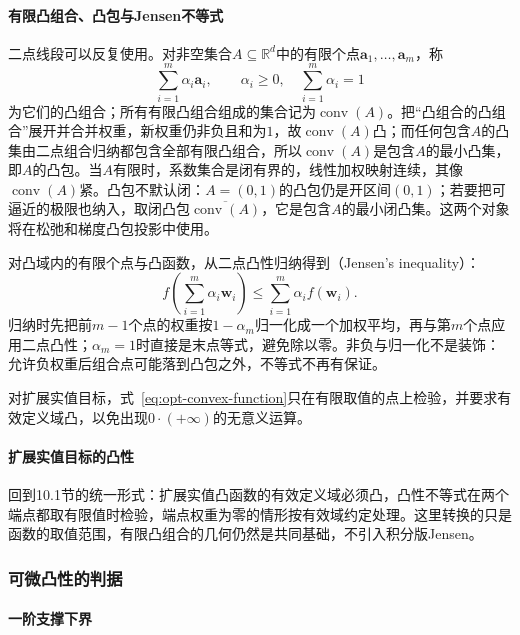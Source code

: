 \paragraph{有限凸组合、凸包与Jensen不等式}

二点线段可以反复使用。对非空集合$A\subseteq\mathbb R^d$中的有限个点$\bm a_1,\ldots,\bm a_m$，称
\[
  \sum_{i=1}^m\alpha_i\bm a_i,\qquad
  \alpha_i\geq0,\quad \sum_{i=1}^m\alpha_i=1
\]
为它们的凸组合；所有有限凸组合组成的集合记为$\operatorname{conv}(A)$。把“凸组合的凸组合”展开并合并权重，新权重仍非负且和为$1$，故$\operatorname{conv}(A)$凸；而任何包含$A$的凸集由二点组合归纳都包含全部有限凸组合，所以$\operatorname{conv}(A)$是包含$A$的最小凸集，即$A$的凸包。当$A$有限时，系数集合是闭有界的，线性加权映射连续，其像$\operatorname{conv}(A)$紧。凸包不默认闭：$A=(0,1)$的凸包仍是开区间$(0,1)$；若要把可逼近的极限也纳入，取闭凸包$\overline{\operatorname{conv}(A)}$，它是包含$A$的最小闭凸集。这两个对象将在松弛和梯度凸包投影中使用。

对凸域内的有限个点与凸函数，从二点凸性归纳得到（Jensen's inequality）：
\begin{equation}
  f\left(\sum_{i=1}^m\alpha_i\bm{w}_i\right)
  \leq\sum_{i=1}^m\alpha_i f(\bm{w}_i).
  \label{eq:opt-jensen}
\end{equation}
归纳时先把前$m-1$个点的权重按$1-\alpha_m$归一化成一个加权平均，再与第$m$个点应用二点凸性；$\alpha_m=1$时直接是末点等式，避免除以零。非负与归一化不是装饰：允许负权重后组合点可能落到凸包之外，不等式不再有保证。

对扩展实值目标，式~\eqref{eq:opt-convex-function}只在有限取值的点上检验，并要求有效定义域凸，以免出现$0\cdot(+\infty)$的无意义运算。

\paragraph{扩展实值目标的凸性}

回到10.1节的统一形式：扩展实值凸函数的有效定义域必须凸，凸性不等式在两个端点都取有限值时检验，端点权重为零的情形按有效域约定处理。这里转换的只是函数的取值范围，有限凸组合的几何仍然是共同基础，不引入积分版Jensen。

\subsubsection{可微凸性的判据}

\paragraph{一阶支撑下界}

